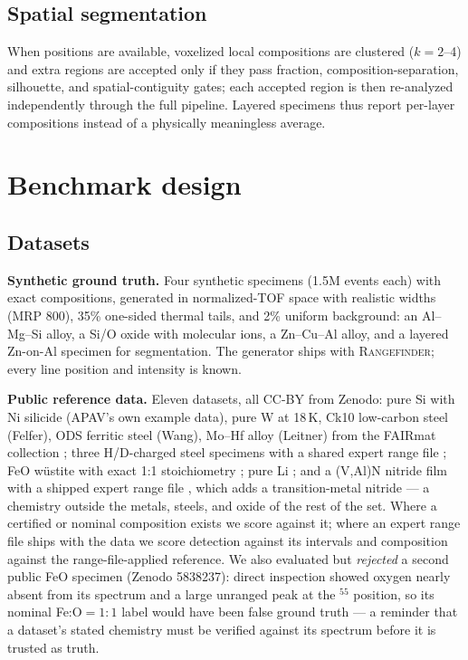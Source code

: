 \documentclass[11pt]{article}
\newcommand{\rf}{\textsc{Rangefinder}}
\begin{document}
\subsection{Spatial segmentation}
When positions are available, voxelized local compositions are clustered
($k=2$--4) and extra regions are accepted only if they pass fraction,
composition-separation, silhouette, and spatial-contiguity gates; each
accepted region is then re-analyzed independently through the full
pipeline. Layered specimens thus report per-layer compositions instead of
a physically meaningless average.

\section{Benchmark design}
\label{sec:benchmark}

\subsection{Datasets}
\textbf{Synthetic ground truth.} Four synthetic specimens (1.5M events
each) with exact compositions, generated in normalized-TOF space with
realistic widths (MRP 800), 35\% one-sided thermal tails, and 2\% uniform
background: an Al--Mg--Si alloy, a Si/O oxide with molecular ions, a
Zn--Cu--Al alloy, and a layered Zn-on-Al specimen for segmentation. The
generator ships with \rf{}; every line position and intensity is known.

\textbf{Public reference data.} Eleven datasets, all CC-BY from Zenodo:
pure Si with Ni silicide (APAV's own example data), pure W at 18\,K, Ck10
low-carbon steel (Felfer), ODS ferritic steel (Wang), Mo--Hf alloy
(Leitner) from the FAIRmat collection \citep{zenodo7979668}; three
H/D-charged steel specimens with a shared expert range file
\citep{zenodo5534859}; FeO w\"ustite with exact 1:1 stoichiometry
\citep{zenodo10677562}; pure Li \citep{zenodo14848236}; and a (V,Al)N
nitride film with a shipped expert range file \citep{zenodo7788883}, which
adds a transition-metal nitride --- a chemistry outside the metals, steels,
and oxide of the rest of the set. Where a certified or nominal composition
exists we score against it; where an expert range file ships with the data
we score detection against its intervals and composition against the
range-file-applied reference. We also evaluated but \emph{rejected} a second
public FeO specimen (Zenodo 5838237): direct inspection showed oxygen nearly
absent from its spectrum and a large unranged peak at the $^{55}$ position,
so its nominal Fe:O${=}1{:}1$ label would have been false ground truth ---
a reminder that a dataset's stated chemistry must be verified against its
spectrum before it is trusted as truth.
\end{document}
